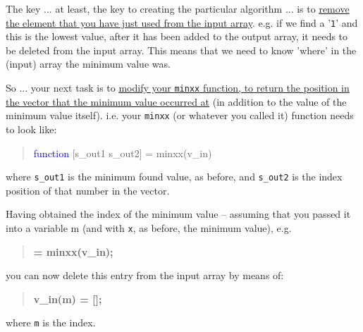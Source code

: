 \documentclass{tufte-book} %
\newenvironment{docspec}{\begin{quotation}\ttfamily\parskip0pt\parindent0pt\ignorespaces}{\end{quotation}}
\newenvironment{docspecbold}{\begin{quotation}\ttfamily\bfseries\parskip0pt\parindent0pt\ignorespaces}{\end{quotation}}
\begin{document}
The key ... at least, the key to creating the particular algorithm ... is to \uline{remove the element that you have just used from the input array}. e.g. if we find a '\texttt{1}' and this is the lowest value, after it has been added to the output array, it needs to be deleted from the input array. This means that we need to know 'where' in the (input) array the minimum value was.

So ... your next task is to \uline{modify your \texttt{minxx} function, to return the position in the vector that the minimum value occurred at} (in addition to the value of the minimum value itself). i.e. your \texttt{minxx} (or whatever you called it) function needs to look like:

\begin{docspec}
\textcolor{blue}{function} [s\_out1 s\_out2] = minxx(v\_in)
\end{docspec}

\noindent where \texttt{s\_out1} is the minimum found value, as before, and \texttt{s\_out2} is the index position of that number in the vector.

Having obtained the index of the minimum value -- assuming that you passed it into a variable m (and with \texttt{x}, as before, the minimum value), e.g.
\begin{docspecbold}
[x m] = minxx(v\_in);
\end{docspecbold}
you can now delete this entry from the input array by means of:
\begin{docspecbold}
v\_in(m) = [];
\end{docspecbold}
where \texttt{m} is the index.
\end{document}
